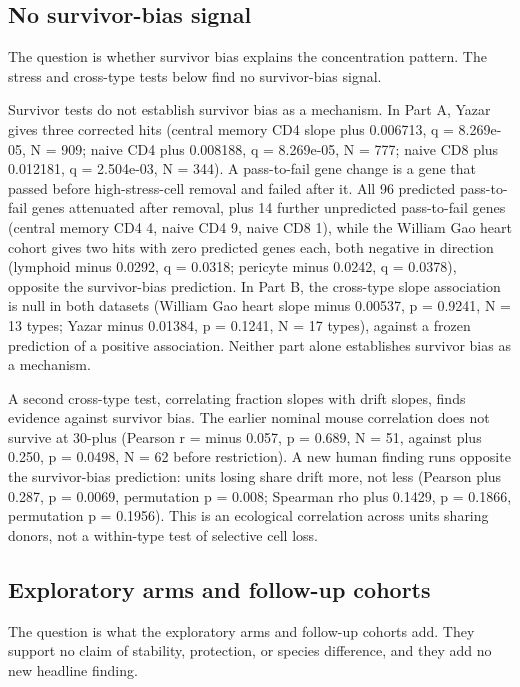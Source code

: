 \documentclass[11pt]{article}
\begin{document}
\subsection*{No survivor-bias signal}

The question is whether survivor bias explains the concentration pattern. The stress and cross-type tests below find no survivor-bias signal.

Survivor tests do not establish survivor bias as a mechanism. In Part A, Yazar gives three corrected hits (central memory CD4 slope plus 0.006713, q = 8.269e-05, N = 909; naive CD4 plus 0.008188, q = 8.269e-05, N = 777; naive CD8 plus 0.012181, q = 2.504e-03, N = 344). A pass-to-fail gene change is a gene that passed before high-stress-cell removal and failed after it. All 96 predicted pass-to-fail genes attenuated after removal, plus 14 further unpredicted pass-to-fail genes (central memory CD4 4, naive CD4 9, naive CD8 1), while the William Gao heart cohort gives two hits with zero predicted genes each, both negative in direction (lymphoid minus 0.0292, q = 0.0318; pericyte minus 0.0242, q = 0.0378), opposite the survivor-bias prediction. In Part B, the cross-type slope association is null in both datasets (William Gao heart slope minus 0.00537, p = 0.9241, N = 13 types; Yazar minus 0.01384, p = 0.1241, N = 17 types), against a frozen prediction of a positive association. Neither part alone establishes survivor bias as a mechanism.

A second cross-type test, correlating fraction slopes with drift slopes, finds evidence against survivor bias. The earlier nominal mouse correlation does not survive at 30-plus (Pearson r = minus 0.057, p = 0.689, N = 51, against plus 0.250, p = 0.0498, N = 62 before restriction). A new human finding runs opposite the survivor-bias prediction: units losing share drift more, not less (Pearson plus 0.287, p = 0.0069, permutation p = 0.008; Spearman rho plus 0.1429, p = 0.1866, permutation p = 0.1956). This is an ecological correlation across units sharing donors, not a within-type test of selective cell loss.

\subsection*{Exploratory arms and follow-up cohorts}

The question is what the exploratory arms and follow-up cohorts add. They support no claim of stability, protection, or species difference, and they add no new headline finding.
\end{document}
